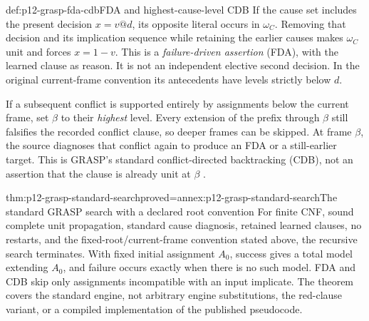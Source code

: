 \begin{hbdefinition}{def:p12-grasp-fda-cdb}{FDA and highest-cause-level CDB}
If the cause set includes the present decision \(x=v@d\), its opposite
literal occurs in \(\omega_C\).  Removing that decision and its implication
sequence while retaining the earlier causes makes \(\omega_C\) unit and
forces \(x=1-v\).  This is a \emph{failure-driven assertion} (FDA), with
the learned clause as reason.  It is not an independent elective second
decision.  In the original current-frame convention its antecedents have
levels strictly below \(d\).

If a subsequent conflict is supported entirely by assignments below the
current frame, set \(\beta\) to their \emph{highest} level.  Every extension
of the prefix through \(\beta\) still falsifies the recorded conflict clause,
so deeper frames can be skipped.  At frame \(\beta\), the source diagnoses
that conflict again to produce an FDA or a still-earlier target.  This is
GRASP's standard conflict-directed backtracking (CDB), not an assertion that
the clause is already unit at \(\beta\)
\cite[Secs.~3.1.1--3.1.2; Eq.~(7)]{MarquesSilvaSakallah1999}.
\end{hbdefinition}

\begin{hbtheorem}{thm:p12-grasp-standard-search}{proved=annex:p12-grasp-standard-search}{The standard GRASP search with a declared root convention}
For finite CNF, sound complete unit propagation, standard cause diagnosis,
retained learned clauses, no restarts, and the fixed-root/current-frame
convention stated above, the recursive search terminates.  With fixed initial
assignment \(A_0\), success gives a total model extending \(A_0\), and
failure occurs exactly when there is no such model.  FDA and CDB skip only
assignments incompatible with an input implicate.  The theorem covers the
standard engine, not arbitrary engine substitutions, the red-clause variant,
or a compiled implementation of the published pseudocode.
\end{hbtheorem}

